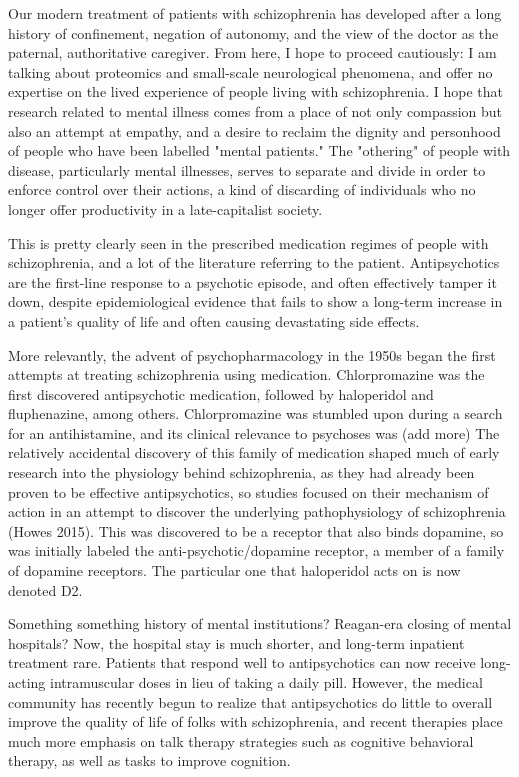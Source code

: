 \documentclass[12pt,twoside]{reedthesis}
\begin{document}
	Our modern treatment of patients with schizophrenia has developed after a long history of confinement, negation of autonomy, and the view of the doctor as the paternal, authoritative caregiver. From here, I hope to proceed cautiously: I am talking about proteomics and small-scale neurological phenomena, and offer no expertise on the lived experience of people living with schizophrenia. I hope that research related to mental illness comes from a place of not only compassion but also an attempt at empathy, and a desire to reclaim the dignity and personhood of people who have been labelled "mental patients." The "othering" of people with disease, particularly mental illnesses, serves to separate and divide in order to enforce control over their actions, a kind of discarding of individuals who no longer offer productivity in a late-capitalist society. 
	
	This is pretty clearly seen in the prescribed medication regimes of people with schizophrenia, and a lot of the literature referring to the patient. Antipsychotics are the first-line response to a psychotic episode, and often effectively tamper it down, despite epidemiological evidence that fails to show a long-term increase in a patient's quality of life and often causing devastating side effects. 
	
	More relevantly, the advent of psychopharmacology in the 1950s began the first attempts at treating schizophrenia using medication. Chlorpromazine was the first discovered antipsychotic medication, followed by haloperidol and fluphenazine, among others. Chlorpromazine was stumbled upon during a search for an antihistamine, and its clinical relevance to psychoses was (add more) The relatively accidental discovery of this family of medication shaped much of early research into the physiology behind schizophrenia, as they had already been proven to be effective antipsychotics, so studies focused on their mechanism of action in an attempt to discover the underlying pathophysiology of schizophrenia (Howes 2015). This was discovered to be a receptor that also binds dopamine, so was initially labeled the anti-psychotic/dopamine receptor, a member of a family of dopamine receptors. The particular one that haloperidol acts on is now denoted D2. 
		
	Something something history of mental institutions? 
	Reagan-era closing of mental hospitals? 
	Now, the hospital stay is much shorter, and long-term inpatient treatment rare. Patients that respond well to antipsychotics can now receive long-acting intramuscular doses in lieu of taking a daily pill. However, the medical community has recently begun to realize that antipsychotics do little to overall improve the quality of life of folks with schizophrenia, and recent therapies place much more emphasis on talk therapy strategies such as cognitive behavioral therapy, as well as tasks to improve cognition. 
	
\end{document}
